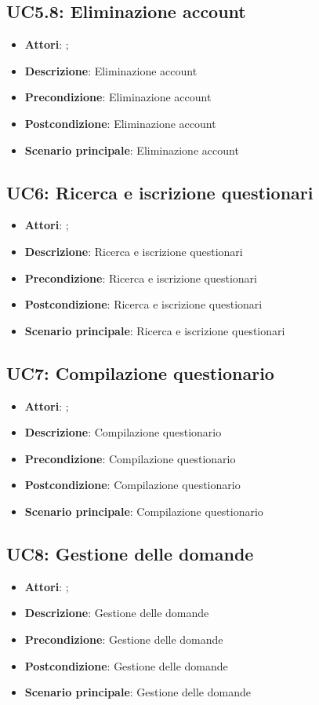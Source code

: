 \subsection{UC5.8: Eliminazione account}
\label{UC5.8}
\begin{itemize}
\item \textbf{Attori}: ;
\item \textbf{Descrizione}: Eliminazione account
\item \textbf{Precondizione}: Eliminazione account
\item \textbf{Postcondizione}: Eliminazione account
\item \textbf{Scenario principale}:
Eliminazione account
\end{itemize}

\subsection{UC6: Ricerca e iscrizione questionari}
\label{UC6}
\begin{itemize}
\item \textbf{Attori}: ;
\item \textbf{Descrizione}: Ricerca e iscrizione questionari
\item \textbf{Precondizione}: Ricerca e iscrizione questionari
\item \textbf{Postcondizione}: Ricerca e iscrizione questionari
\item \textbf{Scenario principale}:
Ricerca e iscrizione questionari
\end{itemize}

\subsection{UC7: Compilazione questionario}
\label{UC7}
\begin{itemize}
\item \textbf{Attori}: ;
\item \textbf{Descrizione}: Compilazione questionario
\item \textbf{Precondizione}: Compilazione questionario
\item \textbf{Postcondizione}: Compilazione questionario
\item \textbf{Scenario principale}:
Compilazione questionario
\end{itemize}

\subsection{UC8: Gestione delle domande}
\label{UC8}
\begin{itemize}
\item \textbf{Attori}: ;
\item \textbf{Descrizione}: Gestione delle domande
\item \textbf{Precondizione}: Gestione delle domande
\item \textbf{Postcondizione}: Gestione delle domande
\item \textbf{Scenario principale}:
Gestione delle domande
\end{itemize}

